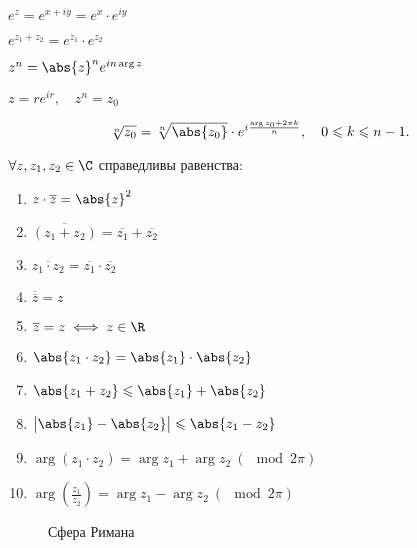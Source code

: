 \begin{multicols}{2}
  $e^z = e^{x+iy} = e^x \cdot e^{iy}$ 

  $e^{z_1+z_2} = e^{z_1}\cdot e^{z_2}$ 

  $z^n = \abs{z}^n e^{in\arg z}$ 

  $z = re^{ir}, \quad z^n = z_0$
\end{multicols}

\[
  \sqrt[n]{z_0} = \sqrt[n]{\abs{z_0}} \cdot e^{i \frac{\arg z_0 + 2\pi k}{n}}, \quad 0 \leqslant k \leqslant n-1.
\]

\begin{theorem}
  $\forall z,z_1,z_2 \in \C$ справедливы равенства:
  \begin{multicols}{2}
    \begin{enumerate}
      \item $z \cdot \overline{z} = \abs{z}^2$ \\
      \item $\overline{(z_1 + z_2)} = \overline{z_1} + \overline{z_2}$ \\
      \item $\overline{z_1 \cdot z_2} = \overline{z_1}\cdot \overline{z_2}$ \\
      \item $\overline{\overline{z}} = z$ \\
      \item $\overline{z} = z \iff z \in \R$ \\
      \item $\abs{z_1 \cdot z_2} = \abs{z_1} \cdot \abs{z_2}$ \\
      \item $\abs{z_1 + z_2} \leqslant \abs{z_1} + \abs{z_2}$ \\
      \item $\big|\abs{z_1} - \abs{z_2}\big| \leqslant \abs{z_1 - z_2}$ \\
      \item $\arg(z_1 \cdot z_2) = \arg z_1 + \arg z_2 \ (\mod 2\pi)$ \\
      \item $\arg \left(\frac{z_1}{z_2}\right) = \arg z_1 - \arg z_2 \ (\mod 2\pi)$
    \end{enumerate}
  \end{multicols}
\end{theorem}

\begin{figure}[H]
  \centering
  \caption{Сфера Римана}
  \label{fig:fig-2}
\end{figure}

